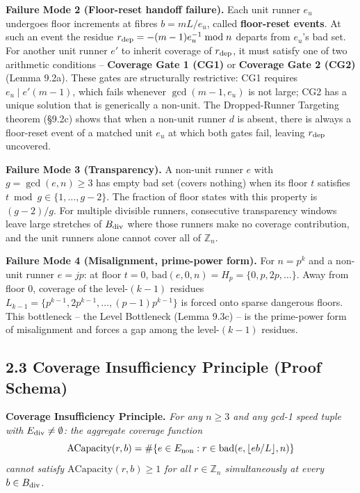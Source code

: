 \documentclass[11pt,a4paper]{article}
\theoremstyle{plain}
\theoremstyle{definition}
\theoremstyle{remark}
\begin{document}
\textbf{Failure Mode 2 (Floor-reset handoff failure).} Each unit runner $e_u$ undergoes floor increments at fibres $b = mL/e_u$, called \textbf{floor-reset events}. At such an event the residue $r_{\rm dep} = -(m-1)e_u^{-1} \bmod n$ departs from $e_u$'s bad set. For another unit runner $e'$ to inherit coverage of $r_{\rm dep}$, it must satisfy one of two arithmetic conditions -- \textbf{Coverage Gate 1 (CG1)} or \textbf{Coverage Gate 2 (CG2)} (Lemma 9.2a). These gates are structurally restrictive: CG1 requires $e_u \mid e'(m-1)$, which fails whenever $\gcd(m-1, e_u)$ is not large; CG2 has a unique solution that is generically a non-unit. The Dropped-Runner Targeting theorem (§9.2c) shows that when a non-unit runner $d$ is absent, there is always a floor-reset event of a matched unit $e_u$ at which both gates fail, leaving $r_{\rm dep}$ uncovered.

\textbf{Failure Mode 3 (Transparency).} A non-unit runner $e$ with $g = \gcd(e,n) \geq 3$ has empty bad set (covers nothing) when its floor $t$ satisfies $t \bmod g \in \{1, \ldots, g-2\}$. The fraction of floor states with this property is $(g-2)/g$. For multiple divisible runners, consecutive transparency windows leave large stretches of $B_{\rm div}$ where those runners make no coverage contribution, and the unit runners alone cannot cover all of $\mathbb{Z}_n$.

\textbf{Failure Mode 4 (Misalignment, prime-power form).} For $n = p^k$ and a non-unit runner $e = jp$: at floor $t=0$, $\mathrm{bad}(e,0,n) = H_p = \{0,p,2p,\ldots\}$. Away from floor $0$, coverage of the level-$(k-1)$ residues $L_{k-1} = \{p^{k-1}, 2p^{k-1}, \ldots, (p-1)p^{k-1}\}$ is forced onto sparse dangerous floors. This bottleneck -- the Level Bottleneck (Lemma 9.3c) -- is the prime-power form of misalignment and forces a gap among the level-$(k-1)$ residues.


\subsection{2.3 Coverage Insufficiency Principle (Proof Schema)}


\textbf{Coverage Insufficiency Principle.} \textit{For any $n \geq 3$ and any gcd-1 speed tuple with $E_{\rm div} \neq \emptyset$: the aggregate coverage function}
\[\mathrm{ACapacity}(r, b) = \#\{e \in E_{\rm non} : r \in \mathrm{bad}(e, \lfloor eb/L \rfloor, n)\}\]
\textit{cannot satisfy $\mathrm{ACapacity}(r, b) \geq 1$ for all $r \in \mathbb{Z}_n$ simultaneously at every $b \in B_{\rm div}$.}
\end{document}
